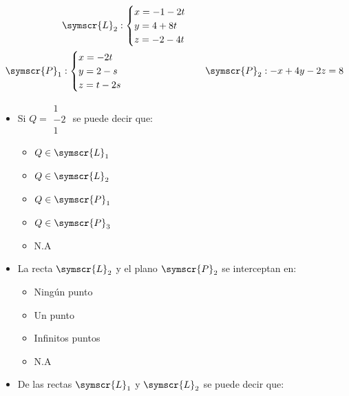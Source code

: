 \documentclass{article}
\def\fancyL{\symscr{L}}
\def\fancyP{\symscr{P}}
\begin{document}
\begin{enumerate}
\[\begin{aligned}
            \hspace{1cm}
            &\fancyL_2: 
            \begin{cases}
                x = -1 -2t \\
                y = 4 +8t \\ 
                z = -2 -4t \\
            \end{cases} 
            \\
            \fancyP_1 &:
            \begin{cases}
                x = -2t \\
                y = 2 - s \\
                z = t - 2s
            \end{cases}
            \hspace{1cm}
            &\fancyP_2: -x + 4y - 2z = 8
            \\
        \end{aligned}
    \]
    \begin{itemize}
        \item Si \(Q = \begin{smallmatrix}1 \\ −2 \\ 1\end{smallmatrix}\) se puede decir que:
            \begin{itemize}
                \item \(Q \in \fancyL_1\)
                \item \(Q \in \fancyL_2\)
                \item \(Q \in \fancyP_1\)
                \item \(Q \in \fancyP_3\)
                \item N.A
            \end{itemize}
        \item La recta \(\fancyL_2\) y el plano \(\fancyP_2\) se interceptan en:
            \begin{itemize}
				\item Ningún punto
				\item Un punto
				\item Infinitos puntos
				\item N.A
            \end{itemize}
        \item De las rectas \(\fancyL_1\) y \(\fancyL_2\) se puede decir que:
            \begin{itemize}

\end{itemize}
\end{itemize}
\end{enumerate}
\end{document}
